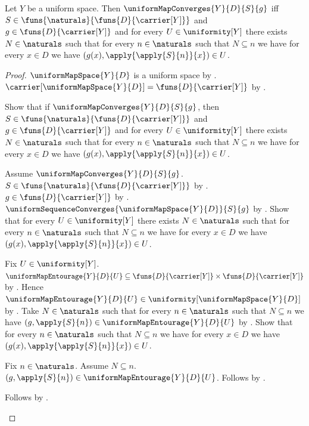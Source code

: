 \begin{theorem}\label{uniform_map_convergence_iff_entourages}
    Let $Y$ be a uniform space.
    Then $\uniformMapConverges{Y}{D}{S}{g}$ iff
        $S\in\funs{\naturals}{\funs{D}{\carrier[Y]}}$ and
        $g\in\funs{D}{\carrier[Y]}$ and for every $U\in\uniformity[Y]$
        there exists $N\in\naturals$ such that for every $n\in\naturals$
        such that $N\subseteq n$ we have for every $x\in D$ we have
            $(g(x),\apply{\apply{S}{n}}{x})\in U$.
\end{theorem}
\begin{proof}
    $\uniformMapSpace{Y}{D}$ is a uniform space by
        .
    $\carrier[\uniformMapSpace{Y}{D}]=\funs{D}{\carrier[Y]}$ by
        .

    Show that if $\uniformMapConverges{Y}{D}{S}{g}$, then
        $S\in\funs{\naturals}{\funs{D}{\carrier[Y]}}$ and
        $g\in\funs{D}{\carrier[Y]}$ and for every $U\in\uniformity[Y]$
        there exists $N\in\naturals$ such that for every $n\in\naturals$
        such that $N\subseteq n$ we have for every $x\in D$ we have
            $(g(x),\apply{\apply{S}{n}}{x})\in U$.
    \begin{subproof}
        Assume $\uniformMapConverges{Y}{D}{S}{g}$.
        $S\in\funs{\naturals}{\funs{D}{\carrier[Y]}}$ by
            .
        $g\in\funs{D}{\carrier[Y]}$ by
            .
        $\uniformSequenceConverges{\uniformMapSpace{Y}{D}}{S}{g}$ by
            .
        Show that for every $U\in\uniformity[Y]$ there exists
            $N\in\naturals$ such that for every $n\in\naturals$ such that
            $N\subseteq n$ we have for every $x\in D$ we have
            $(g(x),\apply{\apply{S}{n}}{x})\in U$.
        \begin{subproof}
            Fix $U\in\uniformity[Y]$.
            $\uniformMapEntourage{Y}{D}{U}\subseteq
                \funs{D}{\carrier[Y]}\times\funs{D}{\carrier[Y]}$ by
                .
            Hence $\uniformMapEntourage{Y}{D}{U}\in
                \uniformity[\uniformMapSpace{Y}{D}]$ by
                .
            Take $N\in\naturals$ such that for every $n\in\naturals$ such
                that $N\subseteq n$ we have
                $(g,\apply{S}{n})\in\uniformMapEntourage{Y}{D}{U}$ by
                .
            Show that for every $n\in\naturals$ such that $N\subseteq n$
                we have for every $x\in D$ we have
                $(g(x),\apply{\apply{S}{n}}{x})\in U$.
            \begin{subproof}
                Fix $n\in\naturals$.
                Assume $N\subseteq n$.
                $(g,\apply{S}{n})\in\uniformMapEntourage{Y}{D}{U}$.
                Follows by .
            \end{subproof}
            Follows by \auto.
        \end{subproof}
    \end{subproof}


\end{proof}
